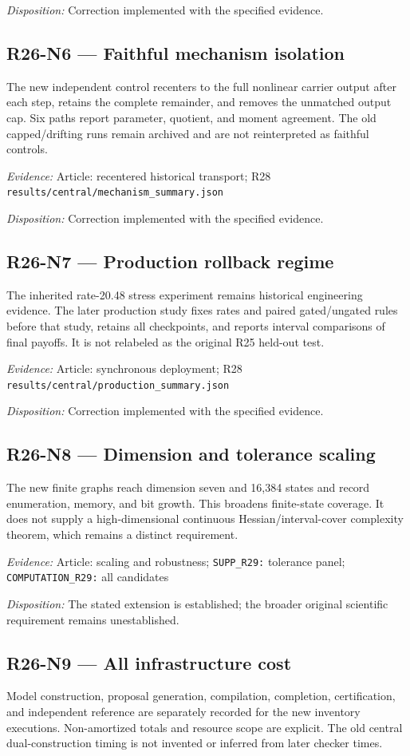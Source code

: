 \emph{Disposition:} Correction implemented with the specified evidence.
\subsection{R26-N6 --- Faithful mechanism isolation}
The new independent control recenters to the full nonlinear carrier output after each step, retains the complete remainder, and removes the unmatched output cap. Six paths report parameter, quotient, and moment agreement. The old capped/drifting runs remain archived and are not reinterpreted as faithful controls.

\emph{Evidence:} Article: recentered historical transport; R28 \nolinkurl{results/central/mechanism_summary.json}

\emph{Disposition:} Correction implemented with the specified evidence.
\subsection{R26-N7 --- Production rollback regime}
The inherited rate-20.48 stress experiment remains historical engineering evidence. The later production study fixes rates and paired gated/ungated rules before that study, retains all checkpoints, and reports interval comparisons of final payoffs. It is not relabeled as the original R25 held-out test.

\emph{Evidence:} Article: synchronous deployment; R28 \nolinkurl{results/central/production_summary.json}

\emph{Disposition:} Correction implemented with the specified evidence.
\subsection{R26-N8 --- Dimension and tolerance scaling}
The new finite graphs reach dimension seven and 16,384 states and record enumeration, memory, and bit growth. This broadens finite-state coverage. It does not supply a high-dimensional continuous Hessian/interval-cover complexity theorem, which remains a distinct requirement.

\emph{Evidence:} Article: scaling and robustness; \nolinkurl{SUPP_R29:} tolerance panel; \nolinkurl{COMPUTATION_R29:} all candidates

\emph{Disposition:} The stated extension is established; the broader original scientific requirement remains unestablished.
\subsection{R26-N9 --- All infrastructure cost}
Model construction, proposal generation, compilation, completion, certification, and independent reference are separately recorded for the new inventory executions. Non-amortized totals and resource scope are explicit. The old central dual-construction timing is not invented or inferred from later checker times.

